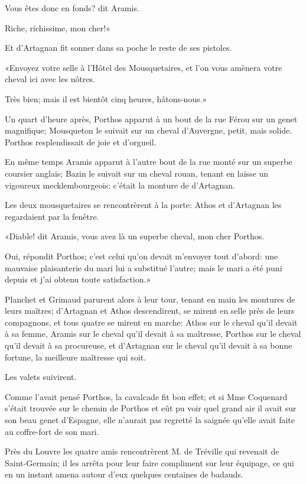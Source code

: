 \speak  Vous êtes donc en fonds? dit Aramis. 

\speak  Riche, richissime, mon cher!» 

Et d'Artagnan fit sonner dans sa poche le reste de ses pistoles. 

«Envoyez votre selle à l'Hôtel des Mousquetaires, et l'on vous amènera votre cheval ici avec les nôtres. 

\speak  Très bien; mais il est bientôt cinq heures, hâtons-nous.» 

Un quart d'heure après, Porthos apparut à un bout de la rue Férou sur un genet magnifique; Mousqueton le suivait sur un cheval d'Auvergne, petit, mais solide. Porthos resplendissait de joie et d'orgueil. 

En même temps Aramis apparut à l'autre bout de la rue monté sur un superbe coursier anglais; Bazin le suivait sur un cheval rouan, tenant en laisse un vigoureux mecklembourgeois: c'était la monture de d'Artagnan. 

Les deux mousquetaires se rencontrèrent à la porte: Athos et d'Artagnan les regardaient par la fenêtre. 

«Diable! dit Aramis, vous avez là un superbe cheval, mon cher Porthos. 

\speak  Oui, répondit Porthos; c'est celui qu'on devait m'envoyer tout d'abord: une mauvaise plaisanterie du mari lui a substitué l'autre; mais le mari a été puni depuis et j'ai obtenu toute satisfaction.» 

Planchet et Grimaud parurent alors à leur tour, tenant en main les montures de leurs maîtres; d'Artagnan et Athos descendirent, se mirent en selle près de leurs compagnons, et tous quatre se mirent en marche: Athos sur le cheval qu'il devait à sa femme, Aramis sur le cheval qu'il devait à sa maîtresse, Porthos sur le cheval qu'il devait à sa procureuse, et d'Artagnan sur le cheval qu'il devait à sa bonne fortune, la meilleure maîtresse qui soit. 

Les valets suivirent. 

Comme l'avait pensé Porthos, la cavalcade fit bon effet; et si Mme Coquenard s'était trouvée sur le chemin de Porthos et eût pu voir quel grand air il avait sur son beau genet d'Espagne, elle n'aurait pas regretté la saignée qu'elle avait faite au coffre-fort de son mari. 

Près du Louvre les quatre amis rencontrèrent M. de Tréville qui revenait de Saint-Germain; il les arrêta pour leur faire compliment sur leur équipage, ce qui en un instant amena autour d'eux quelques centaines de badauds. 

